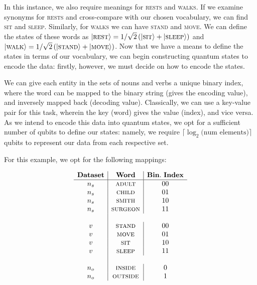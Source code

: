 In this instance, we also require meanings for \textsc{rests} and \textsc{walks}. If we examine synonyms for \textsc{rests} and cross-compare with our chosen vocabulary, we can find \textsc{sit} and \textsc{sleep}. Similarly, for \textsc{walks} we can have \textsc{stand} and \textsc{move}. We can define the states of these words as $\vert \textsc{rest} \rangle = 1/\sqrt{2}\left(\vert \textsc{sit} \rangle + \vert \textsc{sleep} \rangle\right)$ and $\vert \textsc{walk} \rangle = 1/\sqrt{2}\left(\vert \textsc{stand} \rangle + \vert \textsc{move} \rangle\right)$.
Now that we have a means to define the states in terms of our vocabulary, we can begin constructing quantum states to encode the data: firstly, however, we must decide on how to encode the states.

We can give each entity in the sets of nouns and verbs a unique binary index, where the word can be mapped to the binary string (gives the encoding value), and inversely mapped back (decoding value). Classically, we can use a key-value pair for this task, wherein the key (word) gives the value (index), and vice versa. As we intend to encode this data into quantum states, we opt for a sufficient number of qubits to define our states: namely, we require $\lceil \log_2({\textrm{num elements})} \rceil$ qubits to represent our data from each respective set.

For this example, we opt for the following mappings:

\begin{equation*}
\begin{array}{c|c|c}
\mathbf{Dataset} & \mathbf{Word} & \mathbf{Bin.~Index} \\
\hline
{n_s} & \textsc{adult} & 00 \\
{n_s} & \textsc{child} & 01 \\
{n_s} & \textsc{smith} & 10 \\
{n_s} & \textsc{surgeon} & 11 \\
\\
{v} & \textsc{stand} & 00 \\
{v} & \textsc{move} & 01 \\
{v} & \textsc{sit} & 10 \\
{v} & \textsc{sleep} & 11 \\
\\
{n_o} & \textsc{inside} & 0 \\
{n_o} & \textsc{outside} & 1 \\
\end{array}
\end{equation*}

